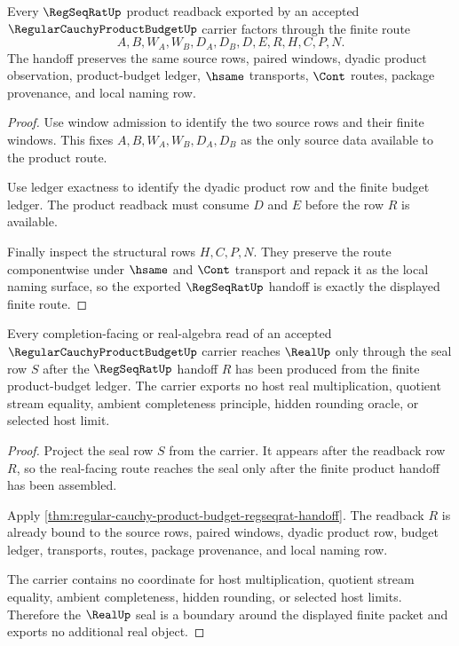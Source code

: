 \begin{theorem}
\label{thm:regular-cauchy-product-budget-regseqrat-handoff}
Every $\RegSeqRatUp$ product readback exported by an accepted $\RegularCauchyProductBudgetUp$ carrier factors through the finite route
$$
A,B,W_A,W_B,D_A,D_B,D,E,R,H,C,P,N.
$$
The handoff preserves the same source rows, paired windows, dyadic product observation, product-budget ledger, $\hsame$ transports, $\Cont$ routes, package provenance, and local naming row.
\end{theorem}
\begin{proof}
Use window admission to identify the two source rows and their finite windows. This fixes $A,B,W_A,W_B,D_A,D_B$ as the only source data available to the product route.

Use ledger exactness to identify the dyadic product row and the finite budget ledger. The product readback must consume $D$ and $E$ before the row $R$ is available.

Finally inspect the structural rows $H,C,P,N$. They preserve the route componentwise under $\hsame$ and $\Cont$ transport and repack it as the local naming surface, so the exported $\RegSeqRatUp$ handoff is exactly the displayed finite route.
\end{proof}

\begin{theorem}
\label{thm:regular-cauchy-product-budget-real-seal-boundary}
Every completion-facing or real-algebra read of an accepted $\RegularCauchyProductBudgetUp$ carrier reaches $\RealUp$ only through the seal row $S$ after the $\RegSeqRatUp$ handoff $R$ has been produced from the finite product-budget ledger. The carrier exports no host real multiplication, quotient stream equality, ambient completeness principle, hidden rounding oracle, or selected host limit.
\end{theorem}
\begin{proof}
Project the seal row $S$ from the carrier. It appears after the readback row $R$, so the real-facing route reaches the seal only after the finite product handoff has been assembled.

Apply \autoref{thm:regular-cauchy-product-budget-regseqrat-handoff}. The readback $R$ is already bound to the source rows, paired windows, dyadic product row, budget ledger, transports, routes, package provenance, and local naming row.

The carrier contains no coordinate for host multiplication, quotient stream equality, ambient completeness, hidden rounding, or selected host limits. Therefore the $\RealUp$ seal is a boundary around the displayed finite packet and exports no additional real object.
\end{proof}

